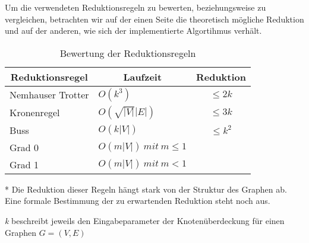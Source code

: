 Um die verwendeten Reduktionsregeln zu bewerten, beziehungsweise zu vergleichen, betrachten wir auf der einen Seite die theoretisch mögliche Reduktion und auf der anderen, wie sich der implementierte Algortihmus verhält. 



\begin{table}[htb]
\caption{Bewertung der Reduktionsregeln\label{tab:liste}}
\vspace*{1em}
\centering

\bgroup
\def\arraystretch{1.3}%
\begin{threeparttable}
\begin{tabular}[c]{l|l|c}
	
	\multicolumn{1}{c|}{\textbf{Reduktionsregel}} & 
	\multicolumn{1}{c|}{\textbf{Laufzeit}} & 
	\multicolumn{1}{c}{\textbf{Reduktion}} \\ 
	
	\hline

	Nemhauser Trotter&$O(k^{3})$&  $\leq 2k$\\
	Kronenregel&$O(\sqrt{|V|}|E|)$ & $\leq 3k$\\
	Buss&$O(k|V|)$  & $\leq k^{2}$\\
	Grad 0&$O(m|V|)\ mit\ m\leq1$& \tnote{*} \\
	Grad 1&$O(m|V|)\ mit\ m<1$& \tnote{*} \\
	
\end{tabular}

\begin{tablenotes}\footnotesize
\item[*] Die Reduktion dieser Regeln hängt stark von der Struktur des Graphen ab. Eine formale Bestimmung der zu erwartenden Reduktion steht noch aus.
\item \emph{k} beschreibt jeweils den Eingabeparameter der Knotenüberdeckung für einen Graphen $G=(V,E)$
\end{tablenotes}

\end{threeparttable}

\egroup

\end{table}

